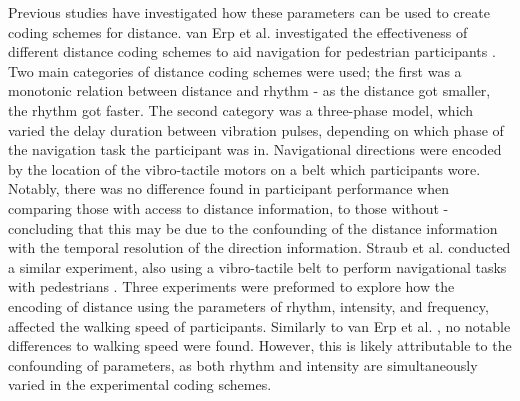 \documentclass{interim}
\begin{document}
Previous studies have investigated how these parameters can be used to create coding schemes for distance. van Erp et al. investigated the effectiveness of different distance coding schemes to aid navigation for pedestrian participants \cite{10.1145/1060581.1060585}. Two main categories of distance coding schemes were used; the first was a monotonic relation between distance and rhythm - as the distance got smaller, the rhythm got faster. The second category was a three-phase model, which varied the delay duration between vibration pulses, depending on which phase of the navigation task the participant was in. Navigational directions were encoded by the location of the vibro-tactile motors on a belt which participants wore. Notably, there was no difference found in participant performance when comparing those with access to distance information, to those without - concluding that this may be due to the confounding of the distance information with the temporal resolution of the direction information. Straub et al. conducted a similar experiment, also using a vibro-tactile belt to perform navigational tasks with pedestrians \cite{5326374}. Three experiments were preformed to explore how the encoding of distance using the parameters of rhythm, intensity, and frequency, affected the walking speed of participants. Similarly to van Erp et al. \cite{10.1145/1060581.1060585}, no notable differences to walking speed were found. However, this is likely attributable to the confounding of parameters, as both rhythm and intensity are simultaneously varied in the experimental coding schemes.
\end{document}
